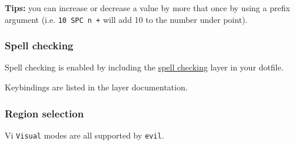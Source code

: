 \documentclass[11pt]{article}
\begin{document}
\textbf{Tips:} you can increase or decrease a value by more that once by using a prefix
argument (i.e. \texttt{10 SPC n +} will add 10 to the number under point).

\subsubsection{Spell checking}
\label{sec:org2cc0627}
Spell checking is enabled by including the \href{../layers/+checkers/spell-checking/README.org}{spell
checking} layer in your dotfile.

Keybindings are listed in the layer documentation.

\subsubsection{Region selection}
\label{sec:orgb117664}
Vi \texttt{Visual} modes are all supported by \texttt{evil}.
\end{document}
